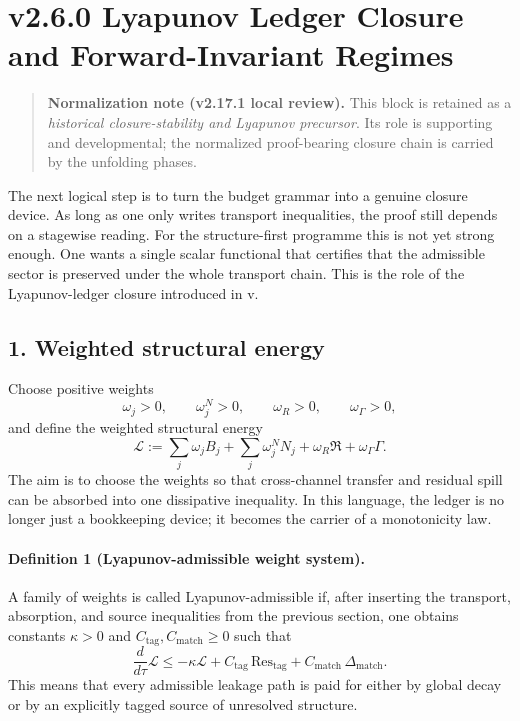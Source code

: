 \section*{v2.6.0 Lyapunov Ledger Closure and Forward-Invariant Regimes}

\begin{quote}
\textbf{Normalization note (v2.17.1 local review).}
This block is retained as a \emph{historical closure-stability and Lyapunov precursor}. Its role is supporting and developmental; the normalized proof-bearing closure chain is carried by the unfolding phases.
\end{quote}

The next logical step is to turn the budget grammar into a genuine closure device.
As long as one only writes transport inequalities, the proof still depends on a
stagewise reading. For the structure-first programme this is not yet strong enough.
One wants a single scalar functional that certifies that the admissible sector is
preserved under the whole transport chain. This is the role of the Lyapunov-ledger
closure introduced in v\docversion.

\subsection*{1. Weighted structural energy}
Choose positive weights
\[
\omega_j>0,
\qquad
\omega^{N}_j>0,
\qquad
\omega_R>0,
\qquad
\omega_\Gamma>0,
\]
and define the weighted structural energy
\[
\mathcal L
:=\sum_j \omega_j B_j + \sum_j \omega^{N}_j N_j + \omega_R\mathfrak R + \omega_\Gamma\Gamma.
\]
The aim is to choose the weights so that cross-channel transfer and residual spill
can be absorbed into one dissipative inequality. In this language, the ledger is no
longer just a bookkeeping device; it becomes the carrier of a monotonicity law.

\paragraph{Definition 1 (Lyapunov-admissible weight system).}
A family of weights is called Lyapunov-admissible if, after inserting the transport,
absorption, and source inequalities from the previous section, one obtains constants
$\kappa>0$ and $C_{\mathrm{tag}},C_{\mathrm{match}}\ge0$ such that
\[
\frac{d}{d\tau}\mathcal L
\le -\kappa \mathcal L
+ C_{\mathrm{tag}}\,\mathrm{Res}_{\mathrm{tag}}
+ C_{\mathrm{match}}\,\Delta_{\mathrm{match}}.
\]
This means that every admissible leakage path is paid for either by global decay or
by an explicitly tagged source of unresolved structure.

